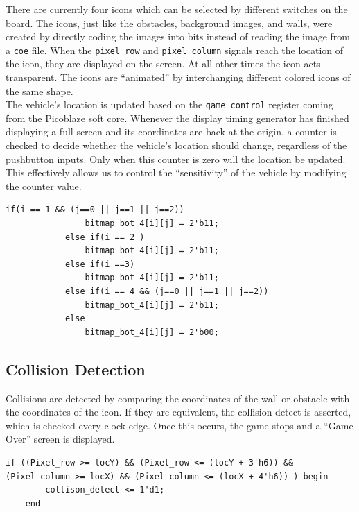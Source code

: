 \documentclass[11pt]{article}
\begin{document}
		There are currently four icons which can be selected by different switches on the board. The icons, just like the obstacles, background images, and walls, were created by directly coding the images into bits instead of reading the image from a \texttt{coe} file. When the \texttt{pixel\_row} and \texttt{pixel\_column} signals reach the location of the icon, they are displayed on the screen. At all other times the icon acts transparent. The icons are ``animated'' by interchanging different colored icons of the same shape.  \\
\hspace{12pt} The vehicle's location is updated based on the \texttt{game\_control} register coming from the Picoblaze soft core. Whenever the display timing generator has finished displaying a full screen and its coordinates are back at the origin, a counter is checked to decide whether the vehicle's location should change, regardless of the pushbutton inputs.  Only when this counter is zero will the location be updated.  This effectively allows us to control the ``sensitivity'' of the vehicle by modifying the counter value. 

\begin{lstlisting}[caption=Example Icon creation, label=hammer]		
			if(i == 1 && (j==0 || j==1 || j==2))
				bitmap_bot_4[i][j] = 2'b11;			
			else if(i == 2 )
				bitmap_bot_4[i][j] = 2'b11;	
			else if(i ==3)
				bitmap_bot_4[i][j] = 2'b11;			
			else if(i == 4 && (j==0 || j==1 || j==2))
				bitmap_bot_4[i][j] = 2'b11;						
			else
				bitmap_bot_4[i][j] = 2'b00;	
 \end{lstlisting}



\subsection{Collision Detection}	
		Collisions are detected by comparing the coordinates of the wall or obstacle with the coordinates of the icon.  If they are equivalent, the collision detect is asserted, which is checked every clock edge. Once this occurs, the game stops and a ``Game Over'' screen is displayed.  

\begin{lstlisting}[caption=Collision Detection Logic, label=collision]		
	if ((Pixel_row >= locY) && (Pixel_row <= (locY + 3'h6)) && (Pixel_column >= locX) && (Pixel_column <= (locX + 4'h6)) ) begin
		collison_detect <= 1'd1;
	end	
 \end{lstlisting}
 
\end{document}
